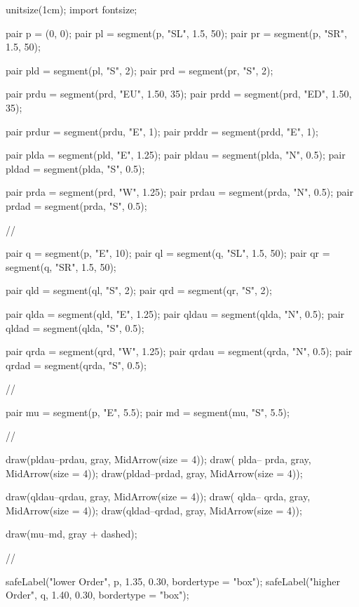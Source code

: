 \documentclass[twoside]{article}
\begin{document}
	\begin{center}
	\begin{asy}
	unitsize(1cm);
	import fontsize;

	pair p       = (0, 0);
	pair pl      = segment(p, "SL", 1.5, 50);
	pair pr      = segment(p, "SR", 1.5, 50);

	pair pld     = segment(pl, "S", 2);
	pair prd     = segment(pr, "S", 2);

	pair prdu    = segment(prd, "EU", 1.50, 35);
	pair prdd    = segment(prd, "ED", 1.50, 35);

	pair prdur   = segment(prdu, "E", 1);
	pair prddr   = segment(prdd, "E", 1);

	pair plda    = segment(pld, "E", 1.25);
	pair pldau   = segment(plda, "N", 0.5);
	pair pldad   = segment(plda, "S", 0.5);

	pair prda    = segment(prd, "W", 1.25);
	pair prdau   = segment(prda, "N", 0.5);
	pair prdad   = segment(prda, "S", 0.5);

	//

	pair q       = segment(p, "E", 10);
	pair ql      = segment(q, "SL", 1.5, 50);
	pair qr      = segment(q, "SR", 1.5, 50);

	pair qld     = segment(ql, "S", 2);
	pair qrd     = segment(qr, "S", 2);

	pair qlda    = segment(qld, "E", 1.25);
	pair qldau   = segment(qlda, "N", 0.5);
	pair qldad   = segment(qlda, "S", 0.5);

	pair qrda    = segment(qrd, "W", 1.25);
	pair qrdau   = segment(qrda, "N", 0.5);
	pair qrdad   = segment(qrda, "S", 0.5);

	//

	pair mu      = segment(p, "E", 5.5);
	pair md      = segment(mu, "S", 5.5);

	//

	draw(pldau--prdau, gray, MidArrow(size = 4));
	draw( plda-- prda, gray, MidArrow(size = 4));
	draw(pldad--prdad, gray, MidArrow(size = 4));

	draw(qldau--qrdau, gray, MidArrow(size = 4));
	draw( qlda-- qrda, gray, MidArrow(size = 4));
	draw(qldad--qrdad, gray, MidArrow(size = 4));

	draw(mu--md, gray + dashed);

	//

	safeLabel("lower Order", p, 1.35, 0.30, bordertype = "box");
	safeLabel("higher Order", q, 1.40, 0.30, bordertype = "box");


\end{asy}
\end{center}
\end{document}
